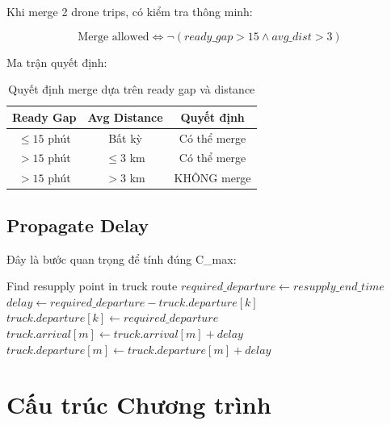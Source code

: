 \documentclass[12pt,a4paper]{article}
\begin{document}
Khi merge 2 drone trips, có kiểm tra thông minh:

\begin{equation}
    \text{Merge allowed} \Leftrightarrow \neg(ready\_gap > 15 \land avg\_dist > 3)
\end{equation}

Ma trận quyết định:
\begin{table}[H]
\centering
\caption{Quyết định merge dựa trên ready gap và distance}
\begin{tabular}{ccc}
\toprule
\textbf{Ready Gap} & \textbf{Avg Distance} & \textbf{Quyết định} \\
\midrule
$\leq 15$ phút & Bất kỳ & Có thể merge \\
$> 15$ phút & $\leq 3$ km & Có thể merge \\
$> 15$ phút & $> 3$ km & KHÔNG merge \\
\bottomrule
\end{tabular}
\end{table}

\subsection{Propagate Delay}

Đây là bước quan trọng để tính đúng C\_max:

\begin{algorithm}[H]
\caption{Propagate Delay}
\begin{algorithmic}[1]
    \STATE Find resupply point in truck route
    \STATE $required\_departure \leftarrow resupply\_end\_time$
        \STATE $delay \leftarrow required\_departure - truck.departure[k]$
        \STATE $truck.departure[k] \leftarrow required\_departure$
            \STATE $truck.arrival[m] \leftarrow truck.arrival[m] + delay$
            \STATE $truck.departure[m] \leftarrow truck.departure[m] + delay$
        \ENDFOR
    \ENDIF
\ENDFOR
\end{algorithmic}
\end{algorithm}

\section{Cấu trúc Chương trình}
\end{document}
